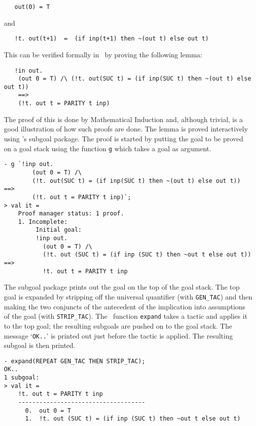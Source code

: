 {\small\baselineskip\HOLSpacing\begin{verbatim}
   out(0) = T
\end{verbatim}}

\noindent and

{\small\baselineskip\HOLSpacing\begin{verbatim}
   !t. out(t+1)  =  (if inp(t+1) then ~(out t) else out t)
\end{verbatim}}

\noindent This can be verified formally in \HOL\ by proving the
following lemma:

{\small\baselineskip\HOLSpacing\begin{verbatim}
   !in out.
    (out 0 = T) /\ (!t. out(SUC t) = (if inp(SUC t) then ~(out t) else out t))
    ==>
    (!t. out t = PARITY t inp)
\end{verbatim}}

\noindent The proof of this is done by Mathematical Induction and, although
trivial, is a good illustration of how such proofs are done.  The
lemma is proved interactively using \HOL's subgoal package.  The proof
is started by putting the goal to be proved on a goal stack using the
function {\small\verb|g|} which takes a goal as argument.

\begin{session}
\begin{verbatim}
- g `!inp out.
        (out 0 = T) /\
        (!t. out(SUC t) = (if inp(SUC t) then ~(out t) else out t)) ==>
        (!t. out t = PARITY t inp)`;
> val it =
    Proof manager status: 1 proof.
    1. Incomplete:
         Initial goal:
         !inp out.
           (out 0 = T) /\
           (!t. out (SUC t) = (if inp (SUC t) then ~out t else out t)) ==>
           !t. out t = PARITY t inp
\end{verbatim}
\end{session}

\noindent The subgoal package prints out the goal on the top of the goal stack.
The top goal is expanded by stripping off the universal quantifier
(with {\small\verb|GEN_TAC|}) and then making the two conjuncts of the
antecedent of the implication into assumptions of the goal (with
{\small\verb|STRIP_TAC|}).  The \ML\ function {\small\verb|expand|}
takes a tactic and applies it to the top goal; the resulting subgoals
are pushed on to the goal stack.  The message `{\small\verb|OK..|}' is
printed out just before the tactic is applied.  The resulting subgoal
is then printed.


\begin{session}
\begin{verbatim}
- expand(REPEAT GEN_TAC THEN STRIP_TAC);
OK..
1 subgoal:
> val it =
    !t. out t = PARITY t inp
    ------------------------------------
      0.  out 0 = T
      1.  !t. out (SUC t) = (if inp (SUC t) then ~out t else out t)
\end{verbatim}
\end{session}

